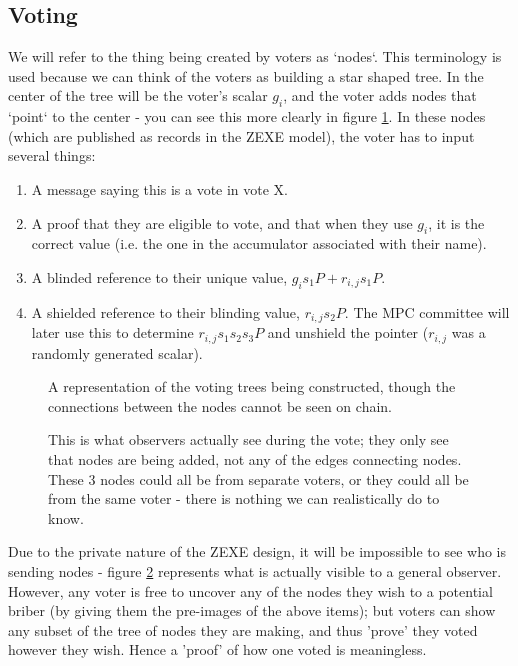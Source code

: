 \documentclass{article}
\begin{document}
\subsection{Voting}
We will refer to the thing being created by voters as `nodes`. This terminology is used because we can think of the voters as building a star shaped tree. In the center of the tree will be the voter's scalar $g_i$, and the voter adds nodes that `point` to the center - you can see this more clearly in figure \ref{fig:figure1}. In these nodes (which are published as records in the ZEXE model), the voter has to input several things:
\begin{enumerate}
    \item A message saying this is a vote in vote X.
    \item A proof that they are eligible to vote, and that when they use $g_i$, it is the correct value (i.e. the one in the accumulator associated with their name).
    \item A blinded reference to their unique value, $g_is_1P+r_{i,j}s_1P$.
    \item A shielded reference to their blinding value, $r_{i,j}s_2P$. The MPC committee will later use this to determine $r_{i,j}s_1s_2s_3P$ and unshield the pointer ($r_{i,j}$ was a randomly generated scalar).
\end{enumerate}

\begin{figure}[h!]
        \centering
        
        \caption{A representation of the voting trees being constructed, though the connections between the nodes cannot be seen on chain.}
        \label{fig:figure1}
\end{figure}

\begin{figure}[h!]
        \centering
        
        \caption{This is what observers actually see during the vote; they only see that nodes are being added, not any of the edges connecting nodes. These 3 nodes could all be from separate voters, or they could all be from the same voter - there is nothing we can realistically do to know.}
        \label{fig:figure2}
\end{figure}

Due to the private nature of the ZEXE design, it will be impossible to see who is sending nodes - figure \ref{fig:figure2} represents what is actually visible to a general observer. However, any voter is free to uncover any of the nodes they wish to a potential briber (by giving them the pre-images of the above items); but voters can show any subset of the tree of nodes they are making, and thus 'prove' they voted however they wish. Hence a 'proof' of how one voted is meaningless.
\end{document}
